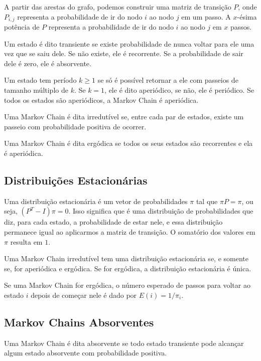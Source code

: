 \documentclass[10pt, a4paper, oneside]{book}
\begin{document}
A partir das arestas do grafo, podemos construir uma matriz de transição $P$, onde $P_{i, j}$ representa a probabilidade de ir do nodo $i$ ao nodo $j$ em um passo. A $x$-ésima potência de $P$ representa a probabilidade de ir do nodo $i$ ao nodo $j$ em $x$ passos.

Um estado é dito transiente se existe probabilidade de nunca voltar para ele uma vez que se saiu dele. Se não existe, ele é recorrente. Se a probabilidade de sair dele é zero, ele é absorvente.

Um estado tem período $k \geq 1$ se só é possível retornar a ele com passeios de tamanho múltiplo de $k$. Se $k = 1$, ele é dito aperiódico, se não, ele é periódico. Se todos os estados são aperiódicos, a Markov Chain é aperiódica.

Uma Markov Chain é dita irredutível se, entre cada par de estados, existe um passeio com probabilidade positiva de ocorrer.

Uma Markov Chain é dita ergódica se todos os seus estados são recorrentes e ela é aperiódica.

\subsection{Distribuições Estacionárias}

Uma distribuição estacionária é um vetor de probabilidades $\pi$ tal que $\pi P = \pi$, ou seja, $(P^T - I) \pi = 0$. Isso significa que é uma distribuição de probabilidades que diz, para cada estado, a probabilidade de estar nele, e essa distribuição permanece igual ao aplicarmos a matriz de transição. O somatório dos valores em $\pi$ resulta em $1$.

Uma Markov Chain irredutível tem uma distribuição estacionária se, e somente se, for aperiódica e ergódica. Se for ergódica, a distribuição estacionária é única.

Se uma Markov Chain for ergódica, o número esperado de passos para voltar ao estado $i$ depois de começar nele é dado por $E(i) = 1/\pi_i$.

\subsection{Markov Chains Absorventes}

Uma Markov Chain é dita absorvente se todo estado transiente pode alcançar algum estado absorvente com probabilidade positiva.
\end{document}
